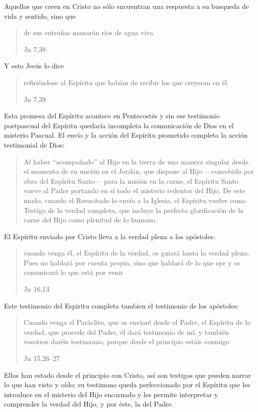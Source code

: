 Aquellos que creen en Cristo no sólo encuentran una respuesta a su busqueda de vida y sentido, sino que \blockquote[Jn 7,38]{de sus entrañas manarán ríos de agua viva}. Y esto Jesús lo dice \blockquote[Jn 7,39]{refiriéndose al Espíritu que habían de recibir los que creyeran en él}. Esta promesa del Espíritu acontece en Pentecostés y sin ese testimonio postpascual del Espíritu quedaría incompleta la comunicación de Dios en el misterio Pascual.\autocite[Cf.][135]{prades2015testimonio} El envío y la acción del Espíritu prometido completa la acción testimonial de Dios: \blockquote[{\cite[134s]{prades2015testimonio}}]{Al haber \enquote{acompañado} al Hijo en la tierra de una manera singular desde el momento de su unción en el Jordán, que dispone al Hijo ---concebido por obra del Espíritu Santo--- para la misión en la carne, el Espíritu Santo vueve al Padre portando en sí todo el misterio redentor del Hijo. De este modo, cuando el Resucitado lo envía a la Iglesia, el Espíritu vuelve como Testigo de la verdad completa, que incluye la perfecta glorificación de la carne del Hijo como plenitud de lo humano.}

El Espíritu enviado por Cristo lleva a la verdad plena a los apóstoles: \blockquote[Jn 16,13]{cuando venga él, el Espíritu de la verdad, os guiará hasta la verdad plena. Pues no hablará por cuenta propia, sino que hablará de lo que oye y os comunicará lo que está por venir}. Este testimonio del Espíritu completa tambíen el testimonio de los apóstoles: \blockquote[Jn 15,26--27]{Cuando venga el Paráclito, que os enviaré desde el Padre, el Espíritu de la verdad, que procede del Padre, él dará testimonio de mí; y también vosotros daréis testimonio, porque desde el principio estáis conmigo}. Ellos han estado desde el principio con Cristo, así son testigos que pueden narrar lo que han visto y oído; su testimono queda perfeccionado por el Espíritu que les introduce en el misterio del Hijo encarnado y les permite interpretar y comprender la verdad del Hijo, y por éste, la del Padre.\autocite[Cf.][139]{prades2015testimonio}

